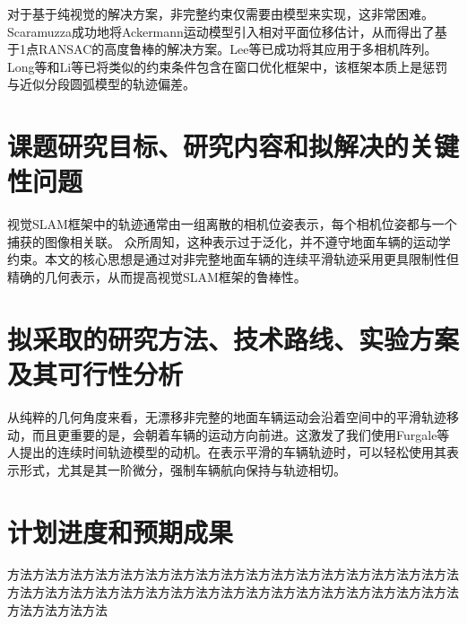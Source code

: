 对于基于纯视觉的解决方案，非完整约束仅需要由模型来实现，这非常困难。Scaramuzza\cite{scaramuzza2009real,scaramuzza2011}成功地将Ackermann运动模型引入相对平面位移估计，从而得出了基于1点RANSAC的高度鲁棒的解决方案。Lee等\cite{lee13}已成功将其应用于多相机阵列。 Long等\cite{zong2017vehicle}和Li等\cite{li18}已将类似的约束条件包含在窗口优化框架中，该框架本质上是惩罚与近似分段圆弧模型的轨迹偏差。

\section{课题研究目标、研究内容和拟解决的关键性问题}

视觉SLAM框架中的轨迹通常由一组离散的相机位姿表示，每个相机位姿都与一个捕获的图像相关联。 众所周知，这种表示过于泛化，并不遵守地面车辆的运动学约束。本文的核心思想是通过对非完整地面车辆的连续平滑轨迹采用更具限制性但精确的几何表示，从而提高视觉SLAM框架的鲁棒性。

\section{拟采取的研究方法、技术路线、实验方案及其可行性分析}

从纯粹的几何角度来看，无漂移非完整的地面车辆运动会沿着空间中的平滑轨迹移动，而且更重要的是，会朝着车辆的运动方向前进。这激发了我们使用Furgale等人提出的连续时间轨迹模型的动机\cite{furgale2015continuous}。在表示平滑的车辆轨迹时，可以轻松使用其表示形式，尤其是其一阶微分，强制车辆航向保持与轨迹相切。

\section{计划进度和预期成果}

方法方法方法方法方法方法方法方法方法方法方法方法方法方法方法方法方法方法方法方法方法方法方法方法方法方法方法方法方法方法方法方法方法方法方法方法方法方法方法方法

{\small


}

